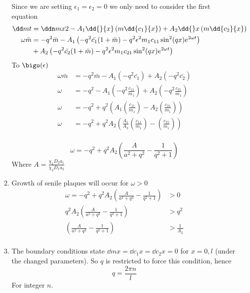 \documentclass{X:/Documents/Coding/Latex/myassignment}
\begin{document}
\begin{enumerate}
\begin{enumerate}
		Since we are setting $\epsilon_1 = \epsilon_2 = 0$ we only need to consider the first equation
		\begin{align*}
			\dd mt &= \ddn mx2 - A_1 \dd{}{x} \left(m \dd{c_1}{x}\right) + A_2 \dd{}x \left(m \dd{c_2}{x}\right)\\
			\omega \bar{m} &= -q^2 \bar{m} - A_1 \left(-q^2 \bar{c_1}(1 + \bar{m}) - q^2 \epsilon^2 m_1c_{11} \sin^2(qx)e^{2 \omega t}\right) \\&+ A_2 \left(-q^2 \bar{c_2}(1 + \bar{m}) - q^2 \epsilon^2 m_1c_{21} \sin^2(qx)e^{2 \omega t}\right)\\
		\end{align*}
		To $\bigo(\epsilon)$
		\begin{align*}
			\omega \bar{m} &= -q^2 \bar{m} - A_1 \left(-q^2 \bar{c_1}\right) + A_2 \left(-q^2 \bar{c_2}\right)\\
			\omega &= -q^2 - A_1 \left(-q^2 \frac{c_{11}}{m_1}\right) + A_2 \left(-q^2 \frac{c_{21}}{m_1}\right)\\
			\omega &= -q^2 +q^2 \left( A_1 \left( \frac{c_{11}}{m_1}\right) - A_2 \left(\frac{c_{21}}{m_1}\right)\right)\\
			\omega &= -q^2 +q^2 A_2 \left( \frac{A_1}{A_2} \left( \frac{c_{11}}{m_1}\right) - \left(\frac{c_{21}}{m_1}\right)\right)\\
		\end{align*}

		\[\omega = -q^2 + q^2 A_2 \left(\frac{A}{a^2 + q^2} - \frac{1}{q^2 + 1}\right)\]
		Where $A = \frac{\chi_1 D_2 a_1}{\chi_2 D_1 a_2}$

		\item Growth of senile plaques will occur for $\omega > 0$
		\begin{align*}
			\omega = - q^2 + q^2 A_2 \left(\frac{A}{a^2 + q^2} - \frac{1}{q^2 + 1}\right) &> 0\\
			q^2 A_2 \left(\frac{A}{a^2 + q^2} - \frac{1}{q^2 + 1}\right) &> q^2\\
			 \left(\frac{A}{a^2 + q^2} - \frac{1}{q^2 + 1}\right) &> \frac{1}{A_2}\\
		\end{align*}
		\item The boundary conditions state $\dd mx = \dd{c_1}x = \dd{c_2} x = 0$ for $x=0,l$ (under the changed parameters). 
		So $q$ is restricted to force this condition, hence 
		\[q = \frac{2\pi n}{l}\]
		For integer $n$.


	\end{enumerate}
\end{enumerate}
\end{document}
